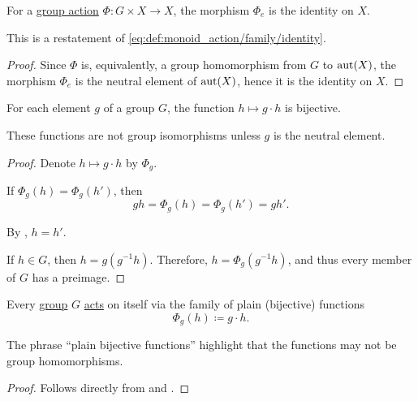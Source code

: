\begin{proposition}\label{thm:group_action_of_neutral_element}
  For a \hyperref[def:group_action]{group action} \( \Phi: G \times X \to X \), the morphism \( \Phi_e \) is the identity on \( X \).
\end{proposition}
\begin{comments}
  \item This is a restatement of \eqref{eq:def:monoid_action/family/identity}.
\end{comments}
\begin{proof}
  Since \( \Phi \) is, equivalently, a group homomorphism from \( G \) to \( \operatorname{aut}(X) \), the morphism \( \Phi_e \) is the neutral element of \( \operatorname{aut}(X) \), hence it is the identity on \( X \).
\end{proof}

\begin{lemma}\label{thm:group_operation_induces_bijections}
  For each element \( g \) of a group \( G \), the function \( h \mapsto g \cdot h \) is bijective.
\end{lemma}
\begin{comments}
  \item These functions are not group isomorphisms unless \( g \) is the neutral element.
\end{comments}
\begin{proof}
  Denote \( h \mapsto g \cdot h \) by \( \Phi_g \).

   If \( \Phi_g(h) = \Phi_g(h') \), then
  \begin{equation*}
    gh = \Phi_g(h) = \Phi_g(h') = gh'.
  \end{equation*}

  By , \( h = h' \).

   If \( h \in G \), then \( h = g(g^{-1} h) \). Therefore, \( h = \Phi_g(g^{-1} h) \), and thus every member of \( G \) has a preimage.
\end{proof}

\begin{proposition}\label{thm:group_is_action}
  Every \hyperref[def:group]{group} \( G \) \hyperref[def:group_action]{acts} on itself via the family of plain (bijective) functions
  \begin{equation*}
    \Phi_g(h) \coloneqq g \cdot h.
  \end{equation*}
\end{proposition}
\begin{comments}
  \item The phrase \enquote{plain bijective functions} highlight that the functions may not be group homomorphisms.
\end{comments}
\begin{proof}
  Follows directly from  and .
\end{proof}


